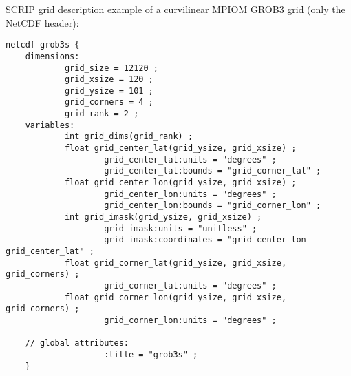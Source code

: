 SCRIP grid description example of a curvilinear MPIOM \cite{MPIOM} GROB3 grid (only the NetCDF header):
\begin{lstlisting}[frame=single, backgroundcolor=\color{pcolor1}, basicstyle=\footnotesize]
    netcdf grob3s {
    dimensions:
            grid_size = 12120 ;
            grid_xsize = 120 ;
            grid_ysize = 101 ;
            grid_corners = 4 ;
            grid_rank = 2 ;
    variables:
            int grid_dims(grid_rank) ;
            float grid_center_lat(grid_ysize, grid_xsize) ;
                    grid_center_lat:units = "degrees" ;
                    grid_center_lat:bounds = "grid_corner_lat" ;
            float grid_center_lon(grid_ysize, grid_xsize) ;
                    grid_center_lon:units = "degrees" ;
                    grid_center_lon:bounds = "grid_corner_lon" ;
            int grid_imask(grid_ysize, grid_xsize) ;
                    grid_imask:units = "unitless" ;
                    grid_imask:coordinates = "grid_center_lon grid_center_lat" ;
            float grid_corner_lat(grid_ysize, grid_xsize, grid_corners) ;
                    grid_corner_lat:units = "degrees" ;
            float grid_corner_lon(grid_ysize, grid_xsize, grid_corners) ;
                    grid_corner_lon:units = "degrees" ;

    // global attributes:
                    :title = "grob3s" ;
    }
\end{lstlisting}





